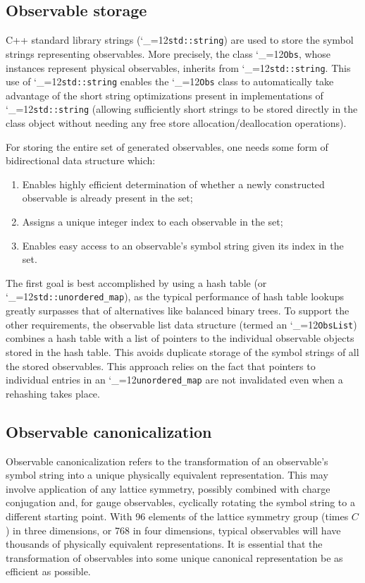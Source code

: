 \documentclass [12pt]{article}
\makeatletter
\renewcommand{\tt}{\begingroup\catcode`_=12\def\_{\string_}\tt@}
\newcommand{\tt@}[1]{\texttt{#1}\endgroup}
\makeatother
\begin{document}
\subsection {Observable storage}

C++ standard library strings (\tt{std::string}) are used to
store the symbol strings representing observables.
More precisely, the class \tt{Obs}, whose instances 
represent physical observables, inherits from \tt{std::string}.
This use of \tt{std::string}
enables the \tt{Obs} class to automatically
take advantage of the short string optimizations present
in implementations of \tt{std::string} (allowing sufficiently
short strings to be stored directly in the class object
without needing any free store allocation/deallocation operations).

For storing the entire set of generated observables,
one needs some form of bidirectional data structure which:
\begin{enumerate}\advance\itemsep -4pt
\item
    Enables highly efficient determination of whether a newly
    constructed observable is already present in the set;
\item
    Assigns a unique integer index to each observable in the set;
\item
    Enables easy access to an observable's symbol string given
    its index in the set.
\end{enumerate}
The first goal is best accomplished by using a hash table
(or \tt{std::unordered_map}), as the typical performance of
hash table lookups greatly surpasses that of alternatives like
balanced binary trees.
To support the other requirements, the observable list data structure
(termed an \tt{ObsList}) combines a hash table with a list of pointers
to the individual observable objects stored in the hash table.
This avoids duplicate storage of the symbol strings of all the
stored observables.
This approach relies on the fact that pointers to individual entries
in an \tt{unordered_map} are not invalidated even when a rehashing
takes place.

\subsection {Observable canonicalization}

Observable canonicalization refers to the
transformation of an observable's symbol string
into a unique physically equivalent representation.
This may involve application of any lattice symmetry,
possibly combined with charge conjugation and,
for gauge observables,
cyclically rotating the symbol string to a different
starting point.
With 96 elements of the lattice symmetry group (times $C$)
in three dimensions, or 768 in four dimensions,
typical observables will have
thousands of physically equivalent representations.
It is essential that the transformation of
observables into some unique canonical representation
be as efficient as possible.
\end{document}
